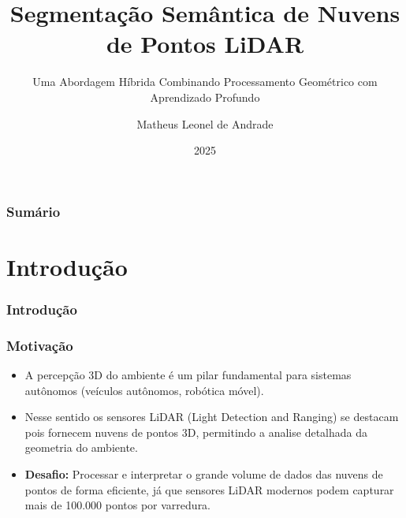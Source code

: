 \documentclass[aspectratio=169,t,xcolor=table]{beamer}
\begin{document}
\title[Inf UFG]{Segmentação Semântica de Nuvens de Pontos LiDAR}
\subtitle{Uma Abordagem Híbrida Combinando Processamento Geométrico
    com Aprendizado Profundo}

\author{Matheus Leonel de Andrade}

\date{2025}
\frame[noframenumbering]{\titlepage}



\begin{frame}
    \frametitle{Sumário}
    \tableofcontents
\end{frame}


\section{Introdução}

\begin{frame}
    \frametitle{Introdução}
\end{frame}


\begin{frame}
    \frametitle{Motivação}
    \begin{itemize}
        \item<+-> A percepção 3D do ambiente é um pilar fundamental para
              sistemas autônomos (veículos autônomos, robótica móvel).
        \item<+-> Nesse sentido os sensores LiDAR (Light Detection and Ranging)
              se destacam pois fornecem nuvens de pontos 3D, permitindo a
              analise detalhada da geometria do ambiente.
        \item<+-> \textbf{Desafio:} Processar e interpretar o grande volume de
              dados das nuvens de pontos de forma eficiente, já que sensores
              LiDAR modernos podem capturar mais de 100.000 pontos por varredura.
    \end{itemize}
\end{frame}
\end{document}
